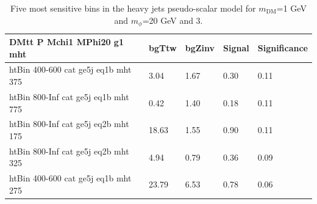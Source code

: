 \begin{table}[h!]
  \centering
  \begin{tabular}{lllll}
    \hline
    \textbf{DMtt P Mchi1 MPhi20 g1 mht} & bgTtw & bgZinv & Signal & Significance \\ \hline
    htBin 400-600 cat ge5j eq1b mht 375 & 3.04 & 1.67 & 0.30 &0.11 \\
    htBin 800-Inf cat ge5j eq1b mht 775 & 0.42 & 1.40 & 0.18 &0.11 \\
    htBin 800-Inf cat ge5j eq2b mht 175 & 18.63 & 1.55 & 0.90 &0.11 \\
    htBin 800-Inf cat ge5j eq2b mht 325 & 4.94 & 0.79 & 0.36 &0.09 \\
    htBin 400-600 cat ge5j eq1b mht 275 & 23.79 & 6.53 & 0.78 &0.06 \\
    \hline
  \end{tabular}
  \caption{Five most sensitive bins in the heavy jets pseudo-scalar model for $m_\textrm{DM}$=1 GeV and $m_\phi$=20 GeV and 3\fbinv. \label{tab:bestBins_tt_P_3fb}}
\end {table}



